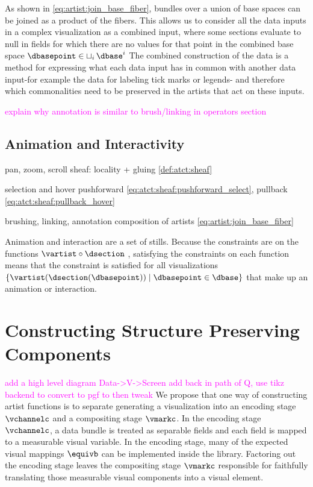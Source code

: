 \documentclass[review]{vgtc}
\newcommand{\note}[1]{\textcolor{magenta}{#1}}
\theoremstyle{definition}
\theoremstyle{remark}
\begin{document}
As shown in \autoref{eq:artist:join_base_fiber}, bundles over a union of base spaces can be joined as a product of the fibers. This allows us to consider all the data inputs in a complex visualization as a combined input, where some sections evaluate to null in fields for which there are no values for that point in the combined base space $\dbasepoint \in \mathop{\sqcup}_{i} \dbase^{i}$ The combined construction of the data is a method for expressing what each data input has in common with another data input-for example the data for labeling tick marks or legends-
and therefore which commonalities need to be preserved in the artists that act on these inputs.

\note{explain why annotation is similar to brush/linking in operators section }

\subsection{Animation and Interactivity}


\begin{LaTeXdescription}
  \item[pan, zoom, scroll] sheaf: locality + gluing \autoref{def:atct:sheaf}
  \item[selection and hover] pushforward \autoref{eq:atct:sheaf:pushforward_select},  pullback \autoref{eq:atct:sheaf:pullback_hover}
  \item[brushing, linking, annotation] composition of artists \autoref{eq:artist:join_base_fiber}
\end{LaTeXdescription}

Animation and interaction are a set of stills. Because the constraints are on the functions $\vartist\circ\dsection$ , satisfying the constraints on each function means that the constraint is satisfied for all visualizations $\{\vartist(\dsection(\dbasepoint)) \mid\dbasepoint \in \dbase \}$ that make up an animation or interaction.



\section{Constructing Structure Preserving Components}
\label{sec:construction}
\note{add a high level diagram Data->V->Screen}
\note{add back in path of Q, use tikz backend to convert to pgf to then tweak}
We propose that one way of constructing artist functions is to separate generating a visualization into an encoding stage $\vchannelc$ and a compositing stage $\vmarkc$. In the \textcolor{artist}{encoding} stage $\vchannelc$, a data bundle is treated as separable fields and each field is mapped to a measurable visual variable. In the encoding stage, many of the expected visual mappings $\equivb$ can be implemented inside the library. Factoring out the encoding stage leaves the \textcolor{artist}{compositing} stage $\vmarkc$ responsible for faithfully translating those measurable visual components into a visual element.
\end{document}

